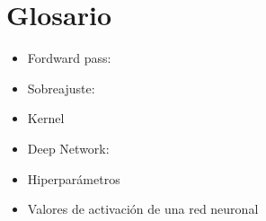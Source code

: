 \documentclass[12,twoside]{TFG-GM}
\theoremstyle{definition}
\theoremstyle{remark}
\begin{document}
\newpage




\appendix
\vfill\newpage 
\section{Glosario}
\begin{itemize}
\item Fordward pass: 
\item Sobreajuste: 
\item Kernel
\item Deep Network:
\item Hiperparámetros
\item Valores de activación de una red neuronal
\end{itemize}
\end{document}
